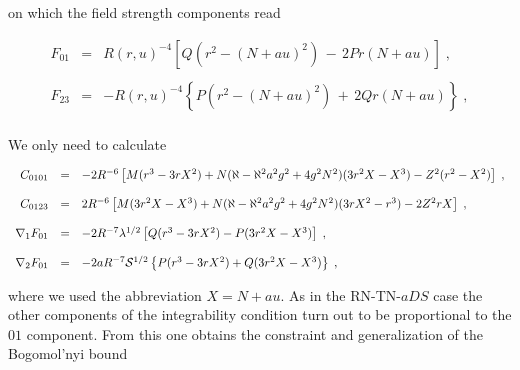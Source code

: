 \documentclass[12pt,a4paper]{article}
\begin{document}
\noindent on which the field strength components read

\begin{equation}
\begin{array}{rcl}
F_{01} & = & R(r,u)^{-4}
           \left[
              Q(r^2 -(N+au)^2 ) \,-\, 2Pr (N+au)
           \right] \; , \\
& & \\
F_{23} & = & -R(r,u)^{-4}
           \left\{
              P(r^2 -(N+au)^2 ) \,+ \, 2Qr(N+au)
           \right\} \; , \\
\end{array}
\end{equation}
%
%

We only need to calculate

\begin{equation}
  \begin{array}{rcl}
C_{0101} &=& -2R^{-6}\left[
               M(r^{3}-3rX^{2})
              +N(\aleph -\aleph^{2}a^{2}g^{2}+4g^{2}N^{2})(3r^{2}X-X^{3})
              -Z^{2}(r^{2}-X^{2})
             \right] \; ,\\
 & & \\
C_{0123} &=& 2R^{-6}\left[
               M(3r^{2}X-X^{3})
              +N(\aleph -\aleph^{2}a^{2}g^{2}+4g^{2}N^{2})(3rX^{2}-r^{3})
              -2Z^{2}rX
             \right] \; , \\
& &  \\
\nabla_{1}F_{01} &=& -2R^{-7}\lambda^{1/2}\left[
                       Q(r^{3}-3rX^{2})-P(3r^{2}X-X^{3})
                     \right] \; ,\\ 
& & \\
\nabla_{2}F_{01} &=& -2aR^{-7}{\cal S}^{1/2}\left\{
                      P(r^{3}-3rX^{2})+Q(3r^{2}X-X^{3})
                     \right\} \; ,\\
  \end{array}
\end{equation}

\noindent where we used the abbreviation $X=N+au$. As 
in the RN-TN-$aDS$ case the other components of the integrability
condition turn out to be proportional to the $01$ component.
{}From this one obtains the constraint and generalization of the Bogomol'nyi bound
\end{document}
